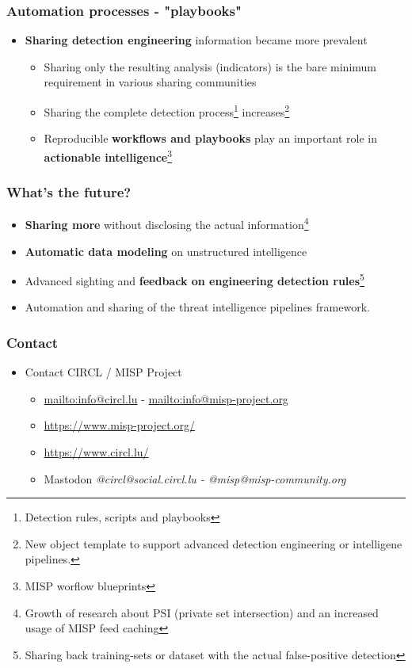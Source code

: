 \begin{frame}
  \frametitle{Automation processes - "playbooks"}
  \begin{itemize}
      \item {\bf Sharing detection engineering} information became more prevalent
              \begin{itemize}
                    \item Sharing only the resulting analysis (indicators) is the bare minimum requirement in various sharing communities
                    \item Sharing the complete detection process\footnote{Detection rules, scripts and playbooks} increases\footnote{New object template to support advanced detection engineering or intelligene pipelines.}
                    \item Reproducible {\bf workflows and playbooks} play an important role in {\bf actionable intelligence}\footnote{MISP worflow blueprints} 
              \end{itemize}
  \end{itemize}
\end{frame}

\begin{frame}
  \frametitle{What's the future?}
  \begin{itemize}
      \item {\bf Sharing more} without disclosing the actual information\footnote{Growth of research about PSI (private set intersection) and an increased usage of MISP feed caching}
      \item {\bf Automatic data modeling} on unstructured intelligence 
      \item Advanced sighting and {\bf feedback on engineering detection rules}\footnote{Sharing back training-sets or dataset with the actual false-positive detection}
      \item Automation and sharing of the threat intelligence pipelines framework. 
  \end{itemize}
\end{frame}

\begin{frame}
    \frametitle{Contact}
  \begin{itemize}
      \item Contact CIRCL / MISP Project
    \begin{itemize}
        \item \url{mailto:info@circl.lu} - \url{mailto:info@misp-project.org}
      \item \url{https://www.misp-project.org/}
      \item \url{https://www.circl.lu/}
      \item Mastodon {\it @circl@social.circl.lu - @misp@misp-community.org}
    \end{itemize}
  \end{itemize}
\end{frame}
